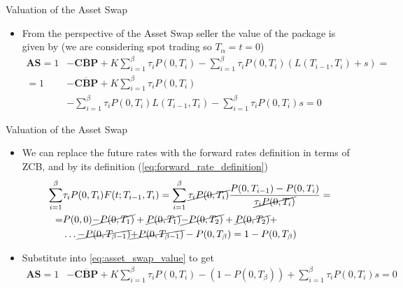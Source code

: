 \documentclass{beamer}
\begin{document}
\begin{frame}{Valuation of the Asset Swap}
	\begin{itemize}
		\item From the perspective of the Asset Swap seller the value of the package is given by (we are considering spot trading so $T_\alpha = t = 0$)
		\begin{equation}
			\begin{aligned}
				\textbf{AS}=1&-\overline{\textbf{CBP}}+K\sum_{i=1}^{\beta}\tau_i P(0,T_i)-\sum_{i=1}^{\beta}\tau_i P(0,T_i)(L(T_{i-1},T_i)+s) =\\
				=1&-\overline{\textbf{CBP}}+K\sum_{i=1}^{\beta}\tau_i P(0,T_i)\\
				&-\sum_{i=1}^{\beta}\tau_i P(0,T_i)L(T_{i-1},T_i)-\sum_{i=1}^{\beta}\tau_i P(0,T_i)s=0
			\end{aligned}
			\label{eq:asset_swap_value}
		\end{equation}
	\end{itemize}
\end{frame}

\begin{frame}{Valuation of the Asset Swap}
	\begin{itemize}
		\item We can replace the future rates with the forward rates definition in terms of ZCB, and by its definition (\cref{eq:forward_rate_definition})
		\begin{equation*}
			\begin{aligned}
			\sum_{i=1}^\beta &\tau_i P(0,T_i)F(t;T_{i-1},T_i) =  \sum_{i=1}^\beta \cancel{\tau_i P(0,T_i)}\frac{P(0,T_{i-1})-P(0,T_i)}{\cancel{\tau_i P(0,T_i)}} = \\
			= &P(0,0) \cancel{- P(0,T_1)} + \cancel{P(0,T_1)} \cancel{- P(0,T_2)} + \cancel{P(0,T_2)} + \\
			&\ldots \cancel{- P(0, T_{\beta-1})} \cancel{+ P(0, T_{\beta-1})}-P(0,T_\beta) = 1-P(0,T_\beta) 
			\end{aligned}
		\end{equation*}
		\item Substitute into \cref{eq:asset_swap_value} to get
		\begin{equation*}
			\begin{aligned}
				\textbf{AS}=1&-\overline{\textbf{CBP}}+K\sum_{i=1}^{\beta}\tau_i P(0,T_i) -(1-P(0,T_\beta))
				+ \sum_{i=1}^\beta\tau_i P(0,T_i)s=0
			\end{aligned}
		\end{equation*}
	\end{itemize}
\end{frame}
\end{document}
